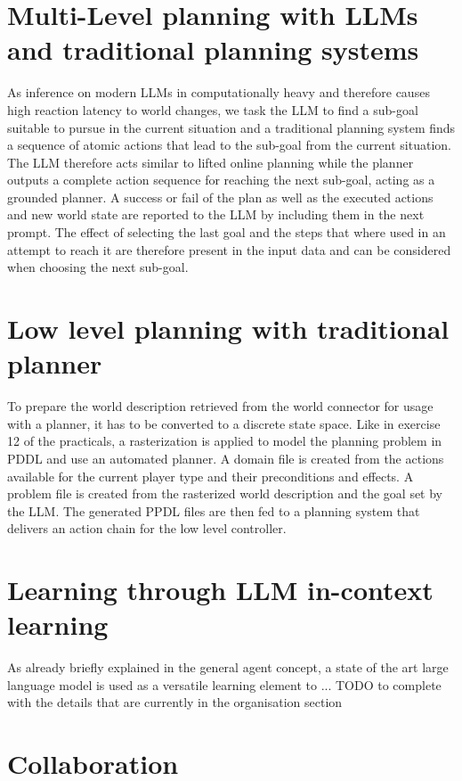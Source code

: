 \documentclass{article}
\begin{document}
\section{Multi-Level planning with LLMs and traditional planning systems}

As inference on modern LLMs in computationally heavy and therefore causes high reaction latency to world changes, we task the LLM to find a sub-goal suitable to pursue in the current situation and a traditional planning system finds a sequence of atomic actions that lead to the sub-goal from the current situation. The LLM therefore acts similar to lifted online planning while the planner outputs a complete action sequence for reaching the next sub-goal, acting as a grounded planner. A success or fail of the plan as well as the executed actions and new world state are reported to the LLM by including them in the next prompt. The effect of selecting the last goal and the steps that where used in an attempt to reach it are therefore present in the input data and can be considered when choosing the next sub-goal.

\section{Low level planning with traditional planner}

To prepare the world description retrieved from the world connector for usage with a planner, it has to be converted to a discrete state space. Like in exercise 12 of the practicals, a rasterization is applied to model the planning problem in PDDL and use an automated planner. A domain file is created from the actions available for the current player type and their preconditions and effects. A problem file is created from the rasterized world description and the goal set by the LLM. The generated PPDL files are then fed to a planning system that delivers an action chain for the low level controller.

\section{Learning through LLM in-context learning}

As already briefly explained in the general agent concept, a state of the art large language model is used as a versatile learning element to ...  TODO to complete with the details that are currently in the organisation section

\section{Collaboration}
\end{document}
